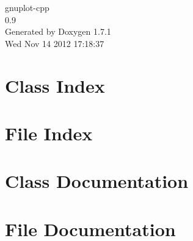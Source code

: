 \documentclass[a4paper]{book}
\begin{document}
\begin{titlepage}
\vspace*{7cm}
\begin{center}
{\Large gnuplot-\/cpp \\[1ex]\large 0.9 }\\
\vspace*{1cm}
{\large Generated by Doxygen 1.7.1}\\
\vspace*{0.5cm}
{\small Wed Nov 14 2012 17:18:37}\\
\end{center}
\end{titlepage}
\clearemptydoublepage
{}
\tableofcontents
\clearemptydoublepage
{}
\chapter{Class Index}

\chapter{File Index}

\chapter{Class Documentation}


\chapter{File Documentation}


\printindex
\end{document}
